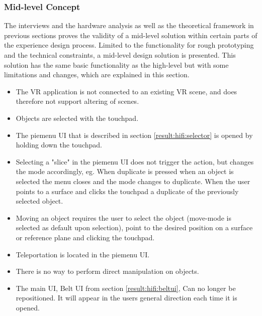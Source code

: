 %
\subsubsection{Mid-level Concept}
\label{result:hifi:midlevel}
The interviews and the hardware analysis as well as the theoretical framework in previous sections proves the validity of a mid-level solution within certain parts of the experience design process. Limited to the functionality for rough prototyping and the technical constraints, a mid-level design solution is presented. This solution has the same basic functionality as the high-level but with some limitations and changes, which are explained in this section.

\begin{itemize}
  \item The VR application is not connected to an existing VR scene, and does therefore not support altering of scenes.
  \item Objects are selected with the touchpad.
  \item The piemenu UI that is described in section \ref{result:hifi:selector} is opened by holding down the touchpad.
  \item Selecting a "slice" in the piemenu UI does not trigger the action, but changes the mode accordingly, eg. When duplicate is pressed when an object is selected the menu closes and the mode changes to duplicate. When the user points to a surface and clicks the touchpad a duplicate of the previously selected object.
  \item Moving an object requires the user to select the object (move-mode is selected as default upon selection), point to the desired position on a surface or reference plane and clicking the touchpad.
  \item Teleportation is located in the piemenu UI.
  \item There is no way to perform direct manipulation on objects.
  \item The main UI, Belt UI from section \ref{result:hifi:beltui}, Can no longer be repositioned. It will appear in the users general direction each time it is opened.

\end{itemize}

